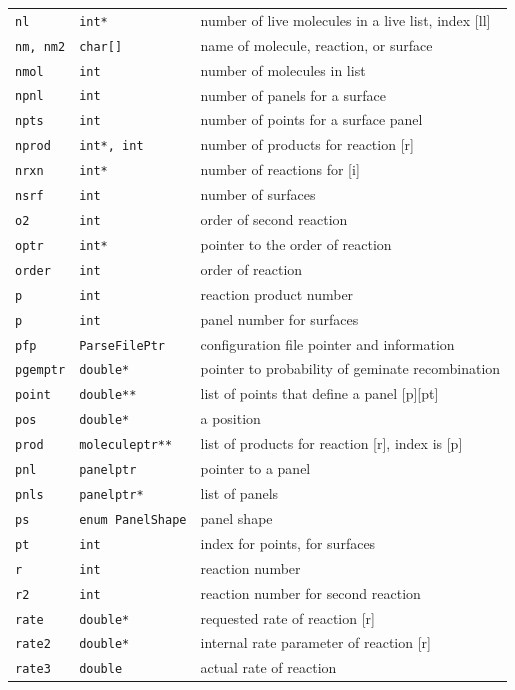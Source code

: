 \documentclass {scrbook}
\newcommand {\ttt} {\texttt}
\begin{document}
\begin{longtable}[c]{lll}
\ttt{nl} & \ttt{int*} & number of live molecules in a live list, index [ll]\\
\ttt{nm, nm2} & \ttt{char[]} & name of molecule, reaction, or surface\\
\ttt{nmol} & \ttt{int} & number of molecules in list\\
\ttt{npnl} & \ttt{int} & number of panels for a surface\\
\ttt{npts} & \ttt{int} & number of points for a surface panel\\
\ttt{nprod} & \ttt{int*, int} & number of products for reaction [r]\\
\ttt{nrxn} & \ttt{int*} & number of reactions for [i]\\
\ttt{nsrf} & \ttt{int} & number of surfaces\\
\ttt{o2} & \ttt{int} & order of second reaction\\
\ttt{optr} & \ttt{int*} & pointer to the order of reaction\\
\ttt{order} & \ttt{int} & order of reaction\\
\ttt{p} & \ttt{int} & reaction product number\\
\ttt{p} & \ttt{int} & panel number for surfaces\\
\ttt{pfp} & \ttt{ParseFilePtr} & configuration file pointer and information\\
\ttt{pgemptr} & \ttt{double*} & pointer to probability of geminate recombination\\
\ttt{point} & \ttt{double**} & list of points that define a panel [p][pt]\\
\ttt{pos} & \ttt{double*} & a position\\
\ttt{prod} & \ttt{moleculeptr**} & list of products for reaction [r], index is [p]\\
\ttt{pnl} & \ttt{panelptr} & pointer to a panel\\
\ttt{pnls} & \ttt{panelptr*} & list of panels\\
\ttt{ps} & \ttt{enum PanelShape} & panel shape\\
\ttt{pt} & \ttt{int} & index for points, for surfaces\\
\ttt{r} & \ttt{int} & reaction number\\
\ttt{r2} & \ttt{int} & reaction number for second reaction\\
\ttt{rate} & \ttt{double*} & requested rate of reaction [r]\\
\ttt{rate2} & \ttt{double*} & internal rate parameter of reaction [r]\\
\ttt{rate3} & \ttt{double} & actual rate of reaction\\

\end{longtable}
\end{document}
